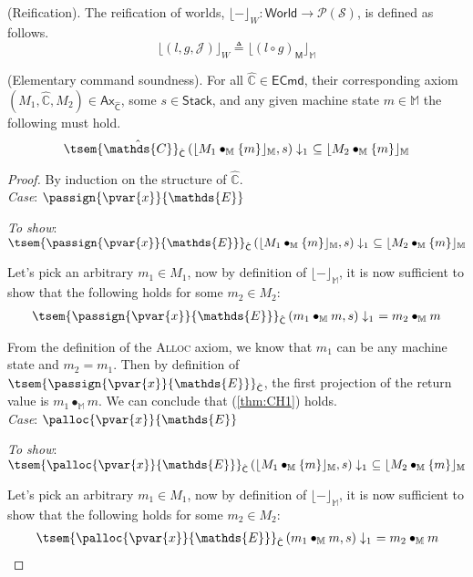  (Reification). The reification of worlds, $\lfloor - \rfloor_W : \mathsf{World} \rightarrow \mathcal{P}(\mathcal{S})$, is defined as follows.
\[
	\lfloor (l, g, \mathcal{J}) \rfloor_W \triangleq \lfloor (l \circ g)_\mathsf{M} \rfloor_\mathbb{M}
\]

\thm \label{thm:eSound} (Elementary command soundness). For all $\hat{\mathds{C}} \in \mathsf{ECmd}$, their corresponding axiom $(M_1, \hat{\mathds{C}}, M_2) \in \mathsf{Ax}_{\hat{\mathsf{C}}}$, some $s \in \mathsf{Stack}$, and any given machine state $m \in \mathbb{M}$ the following must hold.
\[
	\tsem{\hat{\mathds{C}}}_{\hat{\mathsf{C}}} \left( \lfloor M_1 \bullet_\mathbb{M} \{m\} \rfloor_\mathbb{M}, s \right) \downarrow_1\ \subseteq \lfloor M_2 \bullet_\mathbb{M} \{m\} \rfloor_\mathbb{M}
\]
{\parindent0pt
\begin{proof}
By induction on the structure of $\hat{\mathds{C}}$. \\

\textit{Case}: $\passign{\pvar{x}}{\mathds{E}}$

\textit{To show}: $\tsem{\passign{\pvar{x}}{\mathds{E}}}_{\hat{\mathsf{C}}} \left( \lfloor M_1 \bullet_\mathbb{M} \{m\} \rfloor_\mathbb{M}, s \right) \downarrow_1\ \subseteq \lfloor M_2 \bullet_\mathbb{M} \{m\} \rfloor_\mathbb{M}$

Let's pick an arbitrary $m_1 \in M_1$, now by definition of $\lfloor - \rfloor_\mathbb{M}$, it is now sufficient to show that the following holds for some $m_2 \in M_2$:
\begin{gather}
	\label{thm:CH1} \tsem{\passign{\pvar{x}}{\mathds{E}}}_{\hat{\mathsf{C}}} \left(m_1 \bullet_\mathbb{M} m, s \right) \downarrow_1\ = m_2 \bullet_\mathbb{M} m
\end{gather}

From the definition of the \textsc{Alloc} axiom, we know that $m_1$ can be any machine state and $m_2 = m_1$. Then by definition of $\tsem{\passign{\pvar{x}}{\mathds{E}}}_{\hat{\mathsf{C}}}$, the first projection of the return value is $m_1 \bullet_\mathbb{M} m$. We can conclude that (\ref{thm:CH1}) holds.  \\

\textit{Case}: $\palloc{\pvar{x}}{\mathds{E}}$

\textit{To show}: $\tsem{\palloc{\pvar{x}}{\mathds{E}}}_{\hat{\mathsf{C}}} \left( \lfloor M_1 \bullet_\mathbb{M} \{m\} \rfloor_\mathbb{M}, s \right) \downarrow_1\ \subseteq \lfloor M_2 \bullet_\mathbb{M} \{m\} \rfloor_\mathbb{M}$

Let's pick an arbitrary $m_1 \in M_1$, now by definition of $\lfloor - \rfloor_\mathbb{M}$, it is now sufficient to show that the following holds for some $m_2 \in M_2$:
\begin{gather}
	\label{thm:CH3} \tsem{\palloc{\pvar{x}}{\mathds{E}}}_{\hat{\mathsf{C}}} \left(m_1 \bullet_\mathbb{M} m, s \right) \downarrow_1\ = m_2 \bullet_\mathbb{M} m
\end{gather}


\end{proof}}
